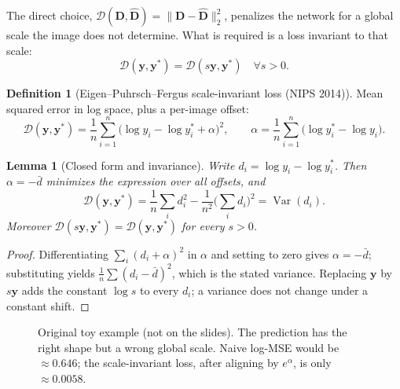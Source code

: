 \documentclass[11pt,a4paper]{article}
\numberwithin{equation}{section}
\theoremstyle{plain}
\newtheorem{lemma}[theorem]{Lemma}
\theoremstyle{definition}
\newtheorem{definition}[theorem]{Definition}
\begin{document}
The direct choice, $\mathcal D(\bm D,\hat{\bm D})=\|\bm D-\hat{\bm D}\|_2^2$, penalizes the network for a global scale the image does not determine. What is required is a loss invariant to that scale:
\[
\mathcal D(\bm y,\bm y^\ast)=\mathcal D(s\bm y,\bm y^\ast)\quad\forall s>0 .
\]
 
\begin{definition}[Eigen--Puhrsch--Fergus scale-invariant loss (NIPS 2014)]
Mean squared error in log space, plus a per-image offset:
\[
\mathcal D(\bm y,\bm y^\ast)=\frac1n\sum_{i=1}^n\big(\log y_i-\log y^\ast_i+\alpha\big)^2,
\qquad
\alpha=\frac1n\sum_{i=1}^n\big(\log y^\ast_i-\log y_i\big).
\]
\end{definition}
 
\begin{lemma}[Closed form and invariance]\label{lem:si}
Write $d_i=\log y_i-\log y^\ast_i$. Then $\alpha=-\bar d$ minimizes the expression over all offsets, and
\[
\mathcal D(\bm y,\bm y^\ast)=\frac1n\sum_i d_i^2-\frac1{n^2}\Big(\sum_i d_i\Big)^2=\operatorname{Var}(d_i).
\]
Moreover $\mathcal D(s\bm y,\bm y^\ast)=\mathcal D(\bm y,\bm y^\ast)$ for every $s>0$.
\end{lemma}
\begin{proof}
Differentiating $\sum_i(d_i+\alpha)^2$ in $\alpha$ and setting to zero gives $\alpha=-\bar d$; substituting yields $\frac1n\sum(d_i-\bar d)^2$, which is the stated variance. Replacing $\bm y$ by $s\bm y$ adds the constant $\log s$ to every $d_i$; a variance does not change under a constant shift. \qedhere
\end{proof}
 
\begin{figure}[htbp]
\centering
{}
\caption{Original toy example (not on the slides). The prediction has the right shape but a wrong global scale. Naive log-MSE would be $\approx0.646$; the scale-invariant loss, after aligning by $e^{\alpha}$, is only $\approx0.0058$.}
\end{figure}
 
\end{document}
